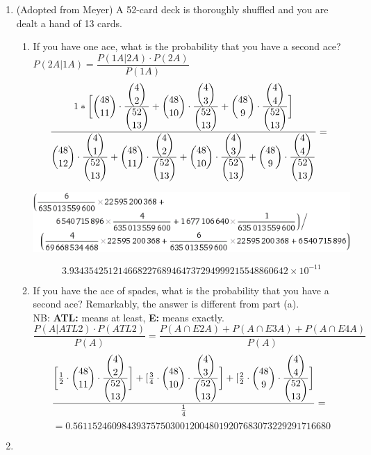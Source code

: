 \documentclass[12pt]{article}
\begin{document}
\begin{enumerate}
\item (Adopted from Meyer) A 52-card deck is thoroughly shuffled and you are dealt a hand of 13 cards. 
  \begin{enumerate}
    \item If you have one ace, what is the probability that you have a second ace? \\
      $P(2A | 1A) = \dfrac{P(1A | 2A) \cdot P(2A)}{P(1A)}$ \\
      \[ \dfrac{1 * \bigg[  \dbinom{48}{11} \cdot \frac{\dbinom{4}{2}}{\dbinom{52}{13}} + \dbinom{48}{10} \cdot \frac{\dbinom{4}{3}}{\dbinom{52}{13}} + \dbinom{48}{9} \cdot \frac{\dbinom{4}{4}}{\dbinom{52}{13}} \bigg]}{\dbinom{48}{12} \cdot \frac{\dbinom{4}{1}}{\dbinom{52}{13}} + \dbinom{48}{11} \cdot \frac{\dbinom{4}{2}}{\dbinom{52}{13}} + \dbinom{48}{10} \cdot \frac{\dbinom{4}{3}}{\dbinom{52}{13}} + \dbinom{48}{9} \cdot \frac{\dbinom{4}{4}}{\dbinom{52}{13}}} = \dfrac{}{} \]

\begin{center}
\includegraphics[scale=0.8]{q2.png}
\end{center}
\[ 3.934354251214668227689464737294999215548860642 × 10^{-11} \]
    \item If you have the ace of spades, what is the probability that you have a second ace? Remarkably, the answer is different from part (a). \\
      NB: \textbf{ATL: } means at least, \textbf{E: } means exactly. 
      \[\frac{P(A | ATL 2) \cdot P(ATL 2)}{P(A)} = \frac{P(A \cap E 2 A) + P(A \cap E 3 A) + P(A \cap E 4 A)}{P(A)} \]
      \[\dfrac{\bigg[\frac{1}{2} \cdot \dbinom{48}{11} \cdot \frac{\dbinom{4}{2}}{\dbinom{52}{13}} \bigg] + [\frac{3}{4} \cdot \dbinom{48}{10} \cdot \frac{\dbinom{4}{3}}{\dbinom{52}{13}} \bigg] + [\frac{2}{2} \cdot \dbinom{48}{9} \cdot \frac{\dbinom{4}{4}}{\dbinom{52}{13}} \bigg]}{\frac{1}{4}} = \dfrac{}{} \]
      \[  = 0.56115246098439375750300120048019207683073229291716680 \]
\end{enumerate}

\item \begin{enumerate}


\end{enumerate}
\end{enumerate}
\end{document}
